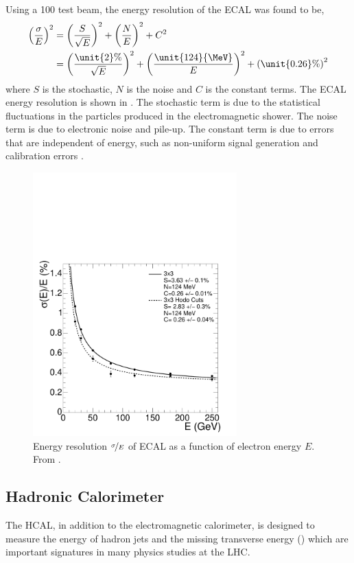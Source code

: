 Using a \unit{100}{\GeV} test beam, the energy resolution of the \ac{ECAL} was
found to be\cite{tdr},
\begin{align}
\left(\frac{\sigma}{E}\right)^{2} 
&= \left(\frac{S}{\sqrt{E}}\right)^{2} + \left(\frac{N}{E}\right)^{2} + C^{2}\\
&=
\left(\frac{\unit{2}{\%}}{\sqrt{E}}\right)^{2} +
\left(\frac{\unit{124}{\MeV}}{E}\right)^{2} + 
\left(\unit{0.26}{\%}\right)^{2}  
\end{align}
where $S$ is the stochastic, $N$ is the noise and $C$ is the constant terms.
The \ac{ECAL} energy resolution is shown in .  The
stochastic term is due to the statistical fluctuations in the particles produced
in the electromagnetic shower. The noise term is due to electronic noise and
pile-up. The constant term is due to errors that are independent of energy, such
as non-uniform signal generation and calibration errors \cite{cms}.

\begin{figure}[htbp]
  \centering
  \includegraphics[width=0.7\textwidth]{ecal_performance}
  \caption{Energy resolution $\nicefrac{\sigma}{E}$ of ECAL as a function of
\label{fig:ECAL} electron energy $E$. From \cite{cms}.}
\end{figure}

\subsection{Hadronic Calorimeter}
The \acf{HCAL}, in addition to the electromagnetic calorimeter,
is designed to measure the energy of hadron jets and the missing transverse
energy (\met) which are important signatures in many physics studies at the LHC.

